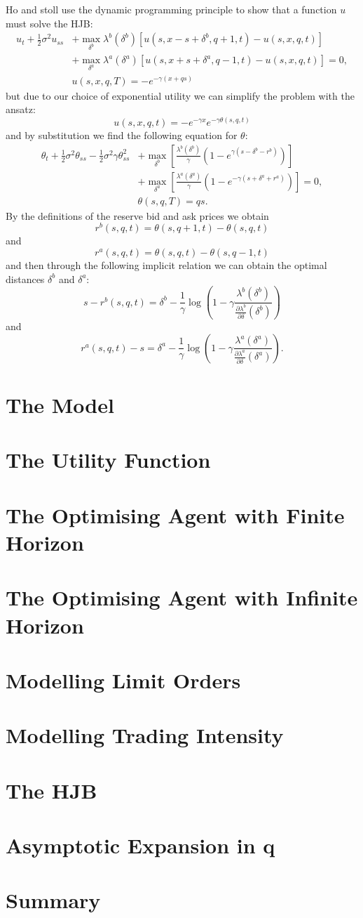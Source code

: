 Ho and stoll use the dynamic programming principle to show that a function $u$ must solve the HJB:
\begin{align*}
    u_t + \frac{1}{2} \sigma^2u_{ss} &+ \max \limits_{ \delta^b } \lambda^b( \delta^b )[ u(s,x-s+\delta^b,q+1,t)-u(s,x,q,t)] \\
    &+\max\limits_{\delta^a}\lambda^a(\delta^a)[u(s,x+s+\delta^a,q-1,t)-u(s,x,q,t)]=0, \\
    & u(s,x,q,T) = -e^{-\gamma(x+qs)}
\end{align*}
but due to our choice of exponential utility we can simplify the problem with the ansatz:
$$u(s,x,q,t)=-e^{-\gamma x}e^{-\gamma\theta(s,q,t)}$$
and by substitution we find the following equation for $\theta:$
\begin{align*}
    \theta_t+\frac{1}{2}\sigma^2\theta_{ss}-\frac{1}{2}\sigma^2\gamma\theta_{ss}^2&+\max\limits_{\delta^b}\left[\frac{\lambda^b(\delta^b)}{\gamma}(1-e^{\gamma(s-\delta^b-r^b)})\right]\\
    &+\max\limits_{\delta^a}\left[\frac{\lambda^a(\delta^a)}{\gamma}(1-e^{-\gamma(s+\delta^a+r^a)})\right]=0,\\
    &\theta(s,q,T)=qs.
\end{align*}
By the definitions of the reserve bid and ask prices we obtain
$$r^b(s,q,t)=\theta(s,q+1,t)-\theta(s,q,t)$$
and
$$r^a(s,q,t)=\theta(s,q,t)-\theta(s,q-1,t)$$
and then through the following implicit relation we can obtain the optimal distances $\delta^b$ and $\delta^a$:
$$s-r^b(s,q,t)=\delta^b-\frac{1}{\gamma}\log\left(1-\gamma\frac{\lambda^b(\delta^b)}{\frac{\partial\lambda^b}{\partial\delta}(\delta^b)}\right)$$
and
$$r^a(s,q,t)-s=\delta^a-\frac{1}{\gamma}\log\left(1-\gamma\frac{\lambda^a(\delta^a)}{\frac{\partial\lambda^a}{\partial\delta}(\delta^a)}\right).$$

\section{The Model}
\section{The Utility Function}
\section{The Optimising Agent with Finite Horizon}
\section{The Optimising Agent with Infinite Horizon}
\section{Modelling Limit Orders}
\section{Modelling Trading Intensity}
\section{The HJB}
\section{Asymptotic Expansion in q}
\section{Summary}